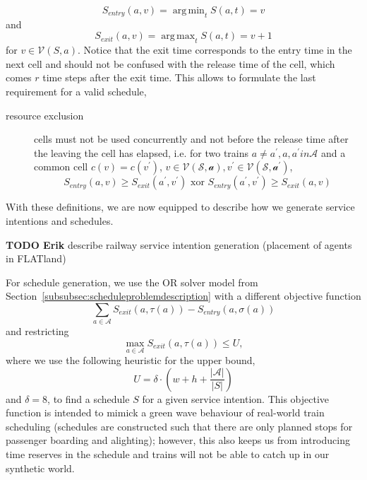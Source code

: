 \documentclass{article}
\DeclareMathOperator*{\argmax}{arg\,max}
\DeclareMathOperator*{\argmin}{arg\,min}
\begin{document}
\begin{equation*}
S_{entry}(a,v) = \argmin_{t} S(a,t)=v
\end{equation*}
and
\begin{equation*}
S_{exit}(a,v) = \argmax_{t} S(a,t)=v + 1
\end{equation*}
for $v \in \mathcal{V}(S,a)$. Notice that the exit time corresponds to the entry time in the next cell and should not be confused with the release time of the cell, which comes $r$ time steps after the exit time. This allows to formulate the last requirement for a valid schedule,
\begin{description}
\item[resource exclusion] cells must not be used concurrently and not before the release time after the leaving the cell has elapsed, i.e. for two trains $a\not=a^\prime, a,a^\prime in \mathcal{A}$ and a common cell $c(v)=c(v^\prime)$, $v\in\mathcal{V(S,a)},v^\prime\in\mathcal{V(S,a^\prime)}$,
\begin{equation}
S_{entry}(a,v) \geq S_{exit}(a^\prime,v^\prime) \textrm{ xor } S_{entry}(a^\prime,v^\prime) \geq S_{exit}(a,v)
\end{equation}
\end{description}


With these definitions, we are now equipped to describe how we generate service intentions and schedules.

\begin{mdframed}
{\bf TODO Erik} describe railway service intention generation (placement of agents in FLATland)
\end{mdframed}

For schedule generation, we use the OR solver model from Section~\ref{subsubsec:scheduleproblemdescription} with a different objective function
\begin{equation}
\sum_{a \in \mathcal{A}} S_{exit}(a,\tau(a)) - S_{entry}(a,\sigma(a))
\end{equation}
and restricting
\begin{equation}
\max_{a \in \mathcal{A}} S_{exit}(a,\tau(a)) \leq U,
\end{equation}
where we use the following heuristic for the upper bound,
\begin{equation}
U=\delta \cdot  \left(w + h + \frac{\left|\mathcal{A}\right|}{\left| S \right|} \right)
\end{equation}
and $\delta=8$,
to find a schedule $S$ for a given service intention. This objective function is intended to mimick a green wave behaviour of real-world train scheduling (schedules are constructed such that there are only planned stops for passenger boarding and alighting); however, this also keeps us from introducing time reserves in the schedule and trains will not be able to catch up in our synthetic world.
\end{document}
